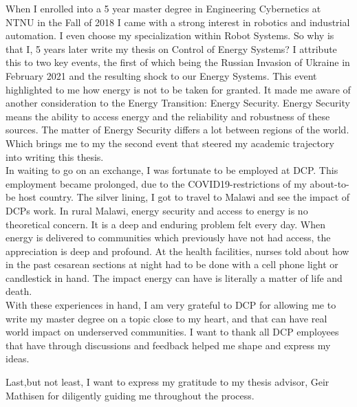 When I enrolled into a 5 year master degree in Engineering Cybernetics at NTNU in the Fall of 2018 I came with a strong interest in robotics and industrial automation. I even choose my specialization within Robot Systems. So why is that I, 5 years later write my thesis on Control of Energy Systems? I attribute this to two key events, the first of which being the Russian Invasion of Ukraine in February 2021 and the resulting shock to our Energy Systems. This event highlighted to me how energy is not to be taken for granted. It made me aware of another consideration to the Energy Transition: Energy Security. Energy Security means the ability to access energy and the reliability and robustness of these sources. The matter of Energy Security differs a lot between regions of the world.  Which brings me to my the second event that steered my academic trajectory into writing this thesis.\\

In waiting to go on an exchange, I was fortunate to be employed at DCP. This employment became prolonged, due to the COVID19-restrictions of my about-to-be host country. The silver lining, I got to travel to Malawi and see the impact of DCPs work. In rural Malawi, energy security and access to energy is no theoretical concern. It is a deep and enduring problem felt every day. When energy is delivered to communities which previously have not had access, the appreciation is deep and profound. 
At the health facilities, nurses told about how in the past cesarean sections at night had to be done with a cell phone light or candlestick in hand. The impact energy can have is literally a matter of life and death.\\

With these experiences in hand, I am very grateful to DCP for allowing me to write my master degree on a topic close to my heart, and that can have real world impact on underserved communities. I want to thank all DCP employees that have through discussions and feedback helped me shape and express my ideas. 

Last,but not least, I want to express my gratitude to my thesis advisor, Geir Mathisen for diligently guiding me throughout the process. 

